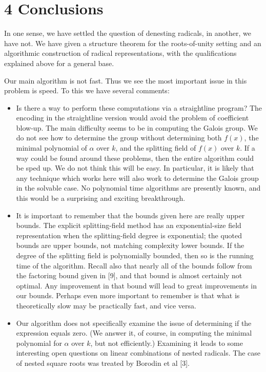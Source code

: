\documentclass[11pt,letterpaper]{article}
\begin{document}
\section*{4 Conclusions}
In one sense, we have settled the question of denesting radicals, in another, we have not. We have given a structure theorem for the roots-of-unity setting and an algorithmic construction of radical representations, with the qualifications explained above for a general base.

Our main algorithm is not fast. Thus we see the most important issue in this problem is speed. To this we have several comments:

\begin{itemize}
  \item[1.] Is there a way to perform these computations via a straightline program? The encoding in the straightline version would avoid the problem of coefficient blow-up. The main difficulty seems to be in computing the Galois group. We do not see how to determine the group without determining both $f(x)$, the minimal polynomial of $\alpha$ over $k$, and the splitting field of $f(x)$ over $k$. If a way could be found around these problems, then the entire algorithm could be sped up. We do not think this will be easy. In particular, it is likely that any technique which works here will also work to determine the Galois group in the solvable case. No polynomial time algorithms are presently known, and this would be a surprising and exciting breakthrough.
  \item[2.] It is important to remember that the bounds given here are really upper bounds. The explicit splitting-field method has an exponential-size field representation when the splitting-field degree is exponential; the quoted bounds are upper bounds, not matching complexity lower bounds. If the degree of the splitting field is polynomially bounded, then so is the running time of the algorithm. Recall also that nearly all of the bounds follow from the factoring bound given in [9], and that bound is almost certainly not optimal. Any improvement in that bound will lead to great improvements in our bounds. Perhaps even more important to remember is that what is theoretically slow may be practically fast, and vice versa.
  \item[3.] Our algorithm does not specifically examine the issue of determining if the expression equals zero. (We answer it, of course, in computing the minimal polynomial for $\alpha$ over $k$, but not efficiently.) Examining it leads to some interesting open questions on linear combinations of nested radicals. The case of nested square roots was treated by Borodin et al [3].
\end{itemize}
\end{document}
